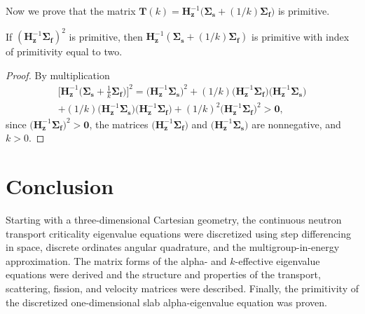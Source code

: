 Now we prove that the matrix $\mathbf{T}(k) = \mathbf{H}_{\mathbf{z}}^{-1} \big (\mathbf{\Sigma_{s}} + (1/k)\mathbf{\Sigma_{f}} \big)$ is primitive.
\begin{theorem}
	If $(\mathbf{H}_{\mathbf{z}}^{-1}\mathbf{\Sigma_{f}})^{2}$ is primitive, then $\mathbf{H}_{\mathbf{z}}^{-1}( \mathbf{\Sigma_{s}} + (1/k)\mathbf{\Sigma_{f}} )$ is primitive with index of primitivity equal to two.
\end{theorem}
\begin{proof}
	By multiplication
	\begin{multline}
		\bigg [ \mathbf{H}_{\mathbf{z}}^{-1} \bigg ( \mathbf{\Sigma_{s}} + \frac{1}{k}\mathbf{\Sigma_{f}} \bigg ) \bigg ]^{2} = \big ( \mathbf{H}_{\mathbf{z}}^{-1} \mathbf{\Sigma_{s}} \big )^{2} + (1/k)\big ( \mathbf{H}_{\mathbf{z}}^{-1} \mathbf{\Sigma_{f}} \big )\big ( \mathbf{H}_{\mathbf{z}}^{-1} \mathbf{\Sigma_{s}} \big ) \\ +(1/k) \big ( \mathbf{H}_{\mathbf{z}}^{-1} \mathbf{\Sigma_{s}} \big )\big ( \mathbf{H}_{\mathbf{z}}^{-1} \mathbf{\Sigma_{f}} \big ) + (1/k)^{2}\big ( \mathbf{H}_{\mathbf{z}}^{-1} \mathbf{\Sigma_{f}} \big )^{2} > \mathbf{0},
	\end{multline}
	since $\big ( \mathbf{H}_{\mathbf{z}}^{-1} \mathbf{\Sigma_{f}} \big )^{2} > \mathbf{0}$, the matrices $\big ( \mathbf{H}_{\mathbf{z}}^{-1} \mathbf{\Sigma_{f}} \big )$ and $\big ( \mathbf{H}_{\mathbf{z}}^{-1} \mathbf{\Sigma_{s}} \big )$ are nonnegative, and $ k > 0$.

\end{proof}

\section{Conclusion}

Starting with a three-dimensional Cartesian geometry, the continuous neutron transport criticality eigenvalue equations were discretized using step differencing in space, discrete ordinates angular quadrature, and the multigroup-in-energy approximation. The matrix forms of the alpha- and $k$-effective eigenvalue equations were derived and the structure and properties of the transport, scattering, fission, and velocity matrices were described. Finally, the primitivity of the discretized one-dimensional slab alpha-eigenvalue equation was proven.

